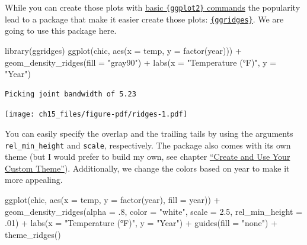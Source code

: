 \documentclass[
  letterpaper,
  DIV=11,
  numbers=noendperiod]{scrreprt}
\newenvironment{Shaded}{\begin{snugshade}}{\end{snugshade}}
\newcommand{\AttributeTok}[1]{\textcolor[rgb]{0.40,0.45,0.13}{#1}}
\newcommand{\DecValTok}[1]{\textcolor[rgb]{0.68,0.00,0.00}{#1}}
\newcommand{\FloatTok}[1]{\textcolor[rgb]{0.68,0.00,0.00}{#1}}
\newcommand{\FunctionTok}[1]{\textcolor[rgb]{0.28,0.35,0.67}{#1}}
\newcommand{\NormalTok}[1]{\textcolor[rgb]{0.00,0.23,0.31}{#1}}
\newcommand{\SpecialCharTok}[1]{\textcolor[rgb]{0.37,0.37,0.37}{#1}}
\newcommand{\StringTok}[1]{\textcolor[rgb]{0.13,0.47,0.30}{#1}}
\begin{document}
While you can create those plots with
\href{https://github.com/halhen/viz-pub/blob/master/sports-time-of-day/2_gen_chart.R}{basic
\texttt{\{ggplot2\}} commands} the popularity lead to a package that
make it easier create those plots:
\href{https://wilkelab.org/ggridges/}{\texttt{\{ggridges\}}}. We are
going to use this package here.

\begin{Shaded}
\begin{Highlighting}[]
\FunctionTok{library}\NormalTok{(ggridges)}
\FunctionTok{ggplot}\NormalTok{(chic, }\FunctionTok{aes}\NormalTok{(}\AttributeTok{x =}\NormalTok{ temp, }\AttributeTok{y =} \FunctionTok{factor}\NormalTok{(year))) }\SpecialCharTok{+}
   \FunctionTok{geom\_density\_ridges}\NormalTok{(}\AttributeTok{fill =} \StringTok{"gray90"}\NormalTok{) }\SpecialCharTok{+}
   \FunctionTok{labs}\NormalTok{(}\AttributeTok{x =} \StringTok{"Temperature (°F)"}\NormalTok{, }\AttributeTok{y =} \StringTok{"Year"}\NormalTok{)}
\end{Highlighting}
\end{Shaded}

\begin{verbatim}
Picking joint bandwidth of 5.23
\end{verbatim}

\texttt{[image: ch15\_files/figure-pdf/ridges-1.pdf]}

You can easily specify the overlap and the trailing tails by using the
arguments \texttt{rel\_min\_height} and \texttt{scale}, respectively.
The package also comes with its own theme (but I would prefer to build
my own, see chapter \hyperref[themes]{``Create and Use Your Custom
Theme''}). Additionally, we change the colors based on year to make it
more appealing.

\begin{Shaded}
\begin{Highlighting}[]
\FunctionTok{ggplot}\NormalTok{(chic, }\FunctionTok{aes}\NormalTok{(}\AttributeTok{x =}\NormalTok{ temp, }\AttributeTok{y =} \FunctionTok{factor}\NormalTok{(year), }\AttributeTok{fill =}\NormalTok{ year)) }\SpecialCharTok{+}
  \FunctionTok{geom\_density\_ridges}\NormalTok{(}\AttributeTok{alpha =}\NormalTok{ .}\DecValTok{8}\NormalTok{, }\AttributeTok{color =} \StringTok{"white"}\NormalTok{,}
                      \AttributeTok{scale =} \FloatTok{2.5}\NormalTok{, }\AttributeTok{rel\_min\_height =}\NormalTok{ .}\DecValTok{01}\NormalTok{) }\SpecialCharTok{+}
  \FunctionTok{labs}\NormalTok{(}\AttributeTok{x =} \StringTok{"Temperature (°F)"}\NormalTok{, }\AttributeTok{y =} \StringTok{"Year"}\NormalTok{) }\SpecialCharTok{+}
  \FunctionTok{guides}\NormalTok{(}\AttributeTok{fill =} \StringTok{"none"}\NormalTok{) }\SpecialCharTok{+}
  \FunctionTok{theme\_ridges}\NormalTok{()}
\end{Highlighting}
\end{Shaded}
\end{document}
